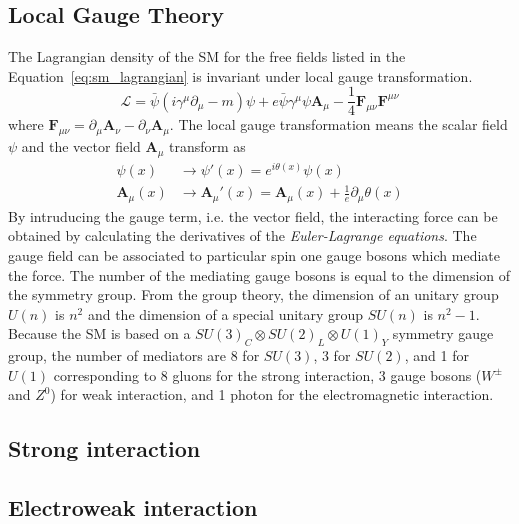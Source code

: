 
\subsection{Local Gauge Theory}
\label{subsec:sm_gauge_theory}
The Lagrangian density of the SM for the free fields listed in the Equation~\ref{eq:sm_lagrangian} is invariant under local gauge transformation.
\begin{equation}
\mathcal{L} = \bar{\psi}(i\gamma^{\mu}\partial_{\mu} - m)\psi + e\bar{\psi}\gamma^{\mu}\psi\bm{A}_{\mu} - \frac{1}{4}\bm{F}_{\mu\nu}\bm{F}^{\mu\nu}
\label{eq:sm_lagrangian}
\end{equation}
where $\bm{F}_{\mu\nu} = \partial_{\mu}\bm{A}_{\nu} - \partial_{\nu}\bm{A}_{\mu}$.
The local gauge transformation means the scalar field $\psi$ and the vector field $\bm{A}_{\mu}$ transform as
\begin{align}
\psi(x) & \rightarrow \psi'(x) = e^{i\theta(x)}\psi(x)\\
\bm{A}_{\mu}(x) & \rightarrow \bm{A}_{\mu}'(x) = \bm{A}_{\mu}(x) + \frac{1}{e}\partial_{\mu}\theta(x)
\label{eq:sm_gauge_transformation}
\end{align}
By intruducing the gauge term, i.e. the vector field, the interacting force can be obtained by calculating the derivatives of the \textit{Euler-Lagrange equations}.
The gauge field can be associated to particular spin one gauge bosons which mediate the force.
The number of the mediating gauge bosons is equal to the dimension of the symmetry group.
From the group theory, the dimension of an unitary group $U(n)$ is $n^{2}$ and the dimension of a special unitary group $SU(n)$ is $n^{2} - 1$.
Because the SM is based on a $SU(3)_{C} \otimes SU(2)_{L} \otimes U(1)_{Y}$ symmetry gauge group, the number of mediators are 8 for $SU(3)$, 3 for $SU(2)$, and 1 for $U(1)$ corresponding to 8 gluons for the strong interaction, 3 gauge bosons ($W^{\pm}$ and $Z^{0}$) for weak interaction, and 1 photon for the electromagnetic interaction.



\subsection{Strong interaction}
\label{subsec:sm_strong_interaction}


\subsection{Electroweak interaction}
\label{subsec:sm_ewk_interaction}

